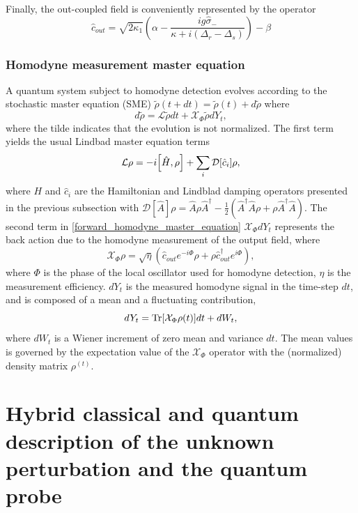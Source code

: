 \documentclass[aps,pra,twocolumn,groupedaddress,showpacs]{revtex4}
\begin{document}
Finally, the out-coupled field is conveniently represented by the operator
\begin{equation}
\hat c_{out} =  \sqrt{2\kappa_1}\left( \alpha - \frac{i g \hat \sigma_-}{\kappa + i (\Delta_r - \Delta_s)} \right) - \beta \label{cout}
\end{equation}

\subsubsection{Homodyne measurement master equation}
A quantum system subject to homodyne detection evolves according to the stochastic master equation (SME) $\tilde\rho(t+dt)= \tilde\rho(t) + d\tilde\rho$ where 
\begin{equation}
d\tilde \rho = \mathcal{L} \tilde \rho dt + \mathcal{X}_\Phi \tilde \rho dY_t, \label{forward_homodyne_master_equation}
\end{equation}
where the tilde indicates that the evolution is not normalized. The first term yields the usual Lindbad master equation terms
\begin{equation} \label{LME}
\mathcal{L}\rho = -i\comm{\hat H}{\rho} + \sum_i\mathcal{D}[\hat c_i]\rho,
\end{equation}
where $H$ and $\hat c_i$ are the Hamiltonian and Lindblad damping operators presented in the previous subsection with $\mathcal{D}[\hat A] \rho = 	\hat A \rho \hat A^\dag - \frac{1}{2} (\hat A^\dag \hat A\rho + \rho\hat A^\dag \hat A)$. The second term in \eqref{forward_homodyne_master_equation} $\mathcal{X}_\Phi dY_t$ represents the back action due to the homodyne measurement of the output field, where
\begin{equation}
\mathcal{X}_\Phi \rho = \sqrt{\eta} \left(\hat c_{out} e^{-i \Phi} \rho + \rho \hat c_{out}^\dag e^{i \Phi} \right),
\end{equation}
where $\Phi$ is the phase of the local oscillator used for homodyne detection, $\eta$ is the measurement efficiency. $dY_t$ is the measured homodyne signal in the time-step $dt$, and is composed of a mean and a fluctuating contribution,
\begin{equation}
dY_t = \Tr[ \mathcal{X}_\Phi \rho(t) ] dt + dW_t,
\end{equation}
where $dW_t$ is a Wiener increment of zero mean and variance $dt$. The mean values is governed by the expectation value of the $\mathcal{X}_\Phi$ operator with the (normalized) density matrix $\rho^(t)$.

\section{Hybrid classical and quantum description of the unknown perturbation and the quantum probe}
  
\end{document}
